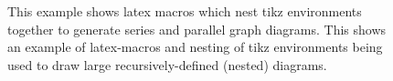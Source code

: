 \documentclass{article}
\begin{document}
\begin{figure}
\centering
\serblock
{\parblock{\serblock{\parblock{\serblock{\block{}}{\serblock{\parblock{\block{}}{\block{}}}{\block{}}}}
{\serblock{\parblock{\serblock{\parblock{\block{}}{\block{}}}{\block{}}}{\block{}}}{\block{}}}}
{\parblock{\serblock{\parblock{\block{}}{\block{}}}
{\block{}}}{\serblock{\parblock{\serblock{\block{}}{\block{}}}{\parblock{\block{}}{\block{}}}}
{\serblock{\block{}}{\block{}}}}}}
{\serblock{\parblock{\parblock{\serblock{\parblock{\serblock{\block{}}{\block{}}}{\serblock{\parblock{\block{}}{\block{}}}
{\block{}}}}{\parblock{\block{}}{\serblock{\parblock{\serblock{\block{}}{\block{}}}
{\parblock{\block{}}{\block{}}}}{\serblock{\block{}}{\block{}}}}}}
{\serblock{\parblock{\block{}}{\serblock{\parblock{\serblock{\block{}}{\block{}}}
{\parblock{\block{}}{\block{}}}}{\serblock{\block{}}{\block{}}}}}{\parblock{\serblock{\block{}}
{\block{}}}{\serblock{\parblock{\block{}}{\block{}}}{\block{}}}}}}{\serblock{\parblock{\serblock{\block{}}
{\block{}}}{\parblock{\block{}}{\block{}}}}{\serblock{\block{}}{\block{}}}}}
{\parblock{\serblock{\parblock{\serblock{\block{}}{\block{}}}{\serblock{\parblock{\block{}}
{\block{}}}{\block{}}}}{\serblock{\parblock{\block{}}{\block{}}}{\block{}}}}{\serblock{\parblock{\block{}}
{\block{}}}{\block{}}}}}}
{\parblock{\block{}}{\block{}}}

\caption[Series and Parallel graph diagram]{This example shows latex macros which nest tikz environments together to generate series and parallel graph diagrams.
This shows an example of latex-macros and nesting of tikz environments being used to draw large recursively-defined (nested) diagrams.}
\end{figure}
\end{document}
